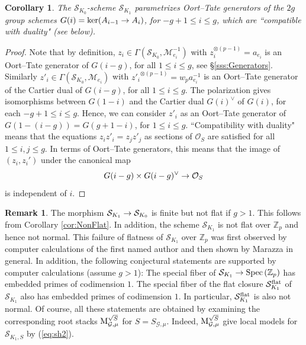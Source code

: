 \documentclass[reqno, 10pt]{amsart}
\makeatletter
\newcommand{\BZ}{\ensuremath{\mathbb {Z}}\xspace}
\newcommand{\CG}{\ensuremath{\mathcal {G}}\xspace}
\newcommand{\CM}{\ensuremath{\mathcal {M}}\xspace}
\newcommand{\CO}{\ensuremath{\mathcal {O}}\xspace}
\newcommand{\CS}{\ensuremath{\mathcal {S}}\xspace}
\DeclareMathOperator{\Spec}{Spec\,}
\newtheorem{corollary}[subsubsection]{Corollary}
\theoremstyle{definition}
\newtheorem{remark}[subsubsection]{Remark}
\numberwithin{equation}{subsection}
\numberwithin{subsubsection}{subsection}
\renewcommand{\to}{%
   \ifbool{@display}{\longrightarrow}{\rightarrow}%
   }
\newcommand{\Mloc}{{\rm M}}
\makeatother
\begin{document}
\begin{corollary}\label{sieOT}
The $\CS_{K_0}$-scheme $\CS_{K_1}$ parametrizes Oort--Tate generators 
of the $2g$  group schemes $G(i)=\ker(A_{i-1}\to A_i)$, for $-g+1\leq i\leq g$, which are ``compatible with duality" (see below).
\end{corollary}
 \begin{proof}

 Note that by definition, $z_i \in \Gamma(\CS_{K_0},  \CM^{-1}_{e_i} )$ with $z_i^{\otimes(p-1)}=a_{e_i}$ is an Oort--Tate generator of $G(i-g)$, for all $1\leq i\leq g$, see \S\ref{sss:Generators}.
Similarly $z'_i\in \Gamma(\CS_{K_0}, \CM_{e_i})$ with ${z'_i}^{\otimes(p-1)}=w_pa_{e_i}^{-1}$ is an Oort--Tate generator of the Cartier dual of $G(i-g)$, for all $1\leq i\leq g$. The polarization gives  isomorphisms between $G(1-i)$ and the Cartier dual $G(i)^\vee$ of $G(i)$, for each $-g+1\leq i\leq g$. Hence, we can 
consider  $z'_i$ as an Oort--Tate generator of   $G(1-(i-g))=G(g+1-i)$, for $1\leq i\leq g$. ``Compatibility with duality" means that the equations $z_iz'_i=z_jz'_j$ as sections of $\CO_S$  are satisfied  for all $1\leq i, j\leq g$. In terms of Oort--Tate generators, this means that the image of $(z_i, z_i')$ under the canonical map
\[
G(i-g)\times G(i-g)^\vee\to \CO_S
\]
is independent of $i$. 
\end{proof}
 

  

\begin{remark}\label{rem:badSiegel}
The morphism $\CS_{K_1}\to \CS_{K_0}$ is finite but not flat if $g>1$. This follows from Corollary \ref{cor:NonFlat}. In addition, the scheme $\CS_{K_1}$ is not flat over $\BZ_p$ and hence not normal. This  failure of flatness of $\CS_{K_1}$ over $\BZ_p$ was first observed   by computer calculations of the first named author and then shown by Marazza \cite{Marazza} in general. In addition, the following conjectural statements are supported by 
computer calculations (assume $g>1$): The special fiber of $\CS_{K_1}\to \Spec(\BZ_p)$ has embedded primes of codimension $1$. The special fiber of the flat closure $\CS_{K_1}^{\rm flat}$ of $\CS_{K_1}$ also has embedded primes of codimension $1$. In particular, $\CS_{K_1}^{\rm flat}$ is also not normal. Of course, all these statements are obtained by examining the corresponding root stacks $\Mloc_{\CG,\mu}^{\sqrt{S}}$ for $S=S_{\CG,\mu}$. Indeed, $\Mloc_{\CG,\mu}^{\sqrt{S}}$ give local models for $\CS_{K_1,S}$ by   (\ref{eq:sh2}). 
\end{remark}
 
\end{document}
